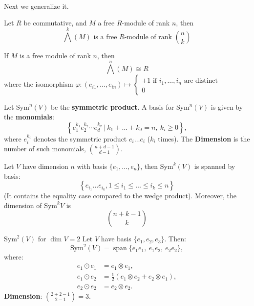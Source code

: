 \documentclass[openany]{book}
\newcommand{\Sym}{\text{Sym}} %
\newcommand{\tensor}{\otimes} %
\begin{document}
Next we generalize it.
\begin{prop}
    Let $R$ be commutative, and $M$ a free $R$-module of rank $n$, then 
    \begin{equation*}
        \bigwedge^k(M) \text{ is a free $R$-module of rank }\binom{n}{k}
    \end{equation*}
\end{prop}

\begin{example}
    If $M$ is a free module of rank $n$, then 
    \begin{equation*}
        \bigwedge^n(M)\cong R
    \end{equation*}
    where the isomorphism $\varphi: (e_{i1},\dots, e_{in})\mapsto\begin{cases}
        \pm 1 \text{ if $i_1,\dots, i_n$ are distinct}\\
        0
    \end{cases}$
\end{example}



\begin{prop}
    Let $\text{Sym}^n(V)$ be the \textbf{symmetric product}. A basis for $\Sym^n(V)$ is given by the \textbf{monomials}:
\[
\left\{ e_1^{k_1} e_2^{k_2} \cdots e_d^{k_d} \ \Bigg| \ k_1+\dots+k_d = n, \ k_i \geq 0 \right\},
\]
where $e_i^{k_i}$ denotes the symmetric product $e_i\dots e_i$ ($k_i$ times). The 
\textbf{Dimension} is the number of such monomials, $\binom{n + d - 1}{d - 1}$.
\end{prop}

\begin{prop}
    Let $V$ have dimension $n$ with basis $\{e_1,\dots, e_n\}$, then $\text{Sym}^k(V)$ is spanned by basis:
    \begin{equation*}
        \left\{ e_{i_1}\dots e_{i_k}, 1\leq i_1\leq\dots\leq i_{k}\leq n\right\}
    \end{equation*}
    (It contains the equality case compared to the wedge product). Moreover, the dimension of $\text{Sym}^kV$ is 
    \begin{equation*}
        \binom{n+k-1}{k}
    \end{equation*}
\end{prop}
\begin{example}
    $\Sym^2(V)$ for $\dim V = 2$
Let $V$ have basis $\{e_1, e_2, e_3\}$. Then:
\[
\Sym^2(V) = \operatorname{span}\{e_1e_1, \ e_1e_2, \ e_2e_2\},
\]
where:
\begin{align*}
    e_1 \odot e_1 &= e_1 \tensor e_1, \\
    e_1 \odot e_2 &= \frac{1}{2}(e_1 \tensor e_2 + e_2 \tensor e_1), \\
    e_2 \odot e_2 &= e_2 \tensor e_2.
\end{align*}
\textbf{Dimension}: $\binom{2 + 2 - 1}{2 - 1} = 3$.
\end{example}
\end{document}
